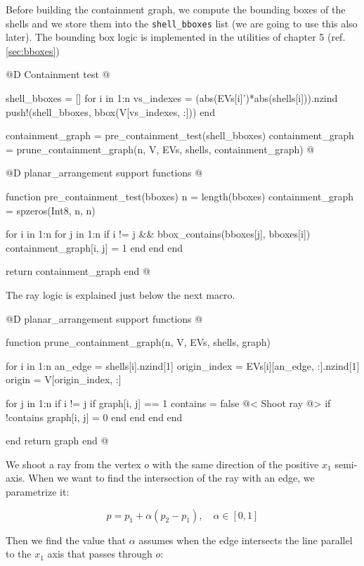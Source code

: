 \documentclass[10pt]{book}
\begin{document}
Before building the containment graph, we
compute the bounding boxes of the shells and we store them into
the \texttt{shell\_bboxes} list (we are going to use this also later).
The bounding box logic is implemented in the utilities of chapter 5 
(ref. \ref{sec:bboxes})

@D Containment test
@{shell_bboxes = []
for i in 1:n
    vs_indexes = (abs(EVs[i]')*abs(shells[i])).nzind
    push!(shell_bboxes, bbox(V[vs_indexes, :]))
end

containment_graph = pre_containment_test(shell_bboxes)
containment_graph = prune_containment_graph(n, V, EVs, shells, containment_graph)
@}

@D planar\_arrangement support functions
@{function pre_containment_test(bboxes)
    n = length(bboxes)
    containment_graph = spzeros(Int8, n, n)

    for i in 1:n
        for j in 1:n
            if i != j && bbox_contains(bboxes[j], bboxes[i])
                containment_graph[i, j] = 1
            end
        end
    end

    return containment_graph
end
@}

The ray logic is explained just below the next macro.

@D planar\_arrangement support functions
@{function prune_containment_graph(n, V, EVs, shells, graph)
    
    for i in 1:n
        an_edge = shells[i].nzind[1]
        origin_index = EVs[i][an_edge, :].nzind[1]
        origin = V[origin_index, :]
 
        for j in 1:n
            if i != j
                if graph[i, j] == 1
                    contains = false
                    @< Shoot ray @>
                    if !contains
                        graph[i, j] = 0
                    end
                end
             end
         end

     end
     return graph
end
@}

We shoot a ray from the vertex $o$ with the same direction
of the positive $x_1$ semi-axis.
When we want to find the intersection of the ray with an edge,
we parametrize it:

\begin{equation}
\label{eq:edge}
    p = p_1 + \alpha(p_2-p_1), \quad\alpha\in[0, 1]
\end{equation}

Then we find the value that $\alpha$ assumes when the edge
intersects the line parallel to the $x_1$ axis that passes through $o$:
\end{document}
